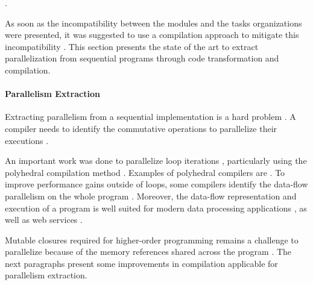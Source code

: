 .

As soon as the incompatibility between the modules and the tasks organizations were presented, it was suggested to use a compilation approach to mitigate this incompatibility \cite{Parnas1972}.
This section presents the state of the art to extract parallelization from sequential programs through code transformation and compilation.


\paragraph{Parallelism Extraction}

Extracting parallelism from a sequential implementation is a hard problem \cite{Johnston2004a}.
A compiler needs to identify the commutative operations to parallelize their executions \cite{Rinard1996,Clements2013a}.

An important work was done to parallelize loop iterations \cite{Mauras1989,Amarasinghe1995,Chen2008,Banerjee2013,Radoi2014}, particularly using the polyhedral compilation method \cite{Bastoul2004}.
Examples of polyhedral compilers are .
To improve performance gains outside of loops, some compilers identify the data-flow parallelism on the whole program \cite{Beck1991,Catanzaro2009,Li2012}.
Moreover, the data-flow representation and execution of a program is well suited for modern data processing applications \cite{Fernandez2014a}, as well as web services \cite{Salmito2013}.

Mutable closures required for higher-order programming remains a challenge to parallelize because of the memory references shared across the program \cite{Harrison1989, Nicolay2010, Matsakis2012a}.
The next paragraphs present some improvements in compilation applicable for parallelism extraction.

